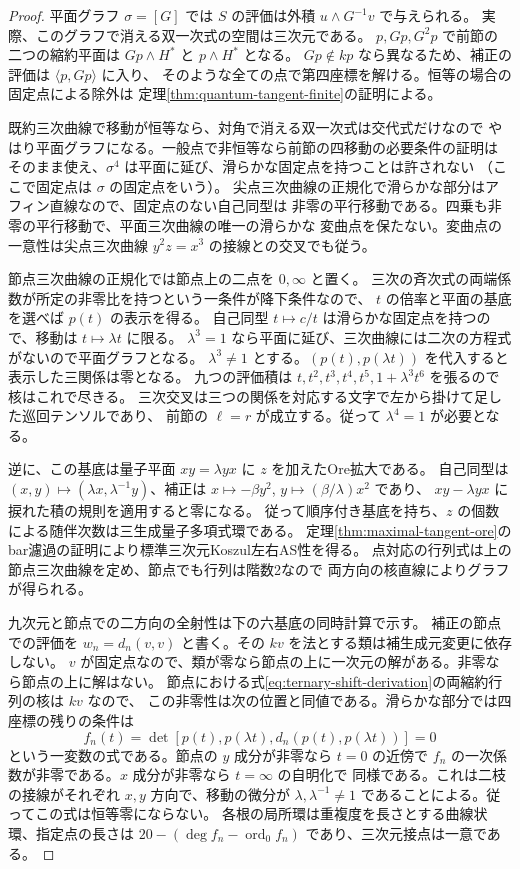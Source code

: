 \begin{proof}
平面グラフ $\sigma=[G]$ では $S$ の評価は外積 $u\wedge G^{-1}v$ で与えられる。
実際、このグラフで消える双一次式の空間は三次元である。
$p,Gp,G^2p$ で前節の二つの縮約平面は
$Gp\wedge H^*$ と $p\wedge H^*$ となる。
$Gp\not\in kp$ なら異なるため、補正の評価は $\langle p,Gp\rangle$ に入り、
そのような全ての点で第四座標を解ける。恒等の場合の固定点による除外は
定理\ref{thm:quantum-tangent-finite}の証明による。

既約三次曲線で移動が恒等なら、対角で消える双一次式は交代式だけなので
やはり平面グラフになる。一般点で非恒等なら前節の四移動の必要条件の証明は
そのまま使え、$\sigma^4$ は平面に延び、滑らかな固定点を持つことは許されない
（ここで固定点は $\sigma$ の固定点をいう）。
尖点三次曲線の正規化で滑らかな部分はアフィン直線なので、固定点のない自己同型は
非零の平行移動である。四乗も非零の平行移動で、平面三次曲線の唯一の滑らかな
変曲点を保たない。変曲点の一意性は尖点三次曲線 $y^2z=x^3$ の接線との交叉でも従う。

節点三次曲線の正規化では節点上の二点を $0,\infty$ と置く。
三次の斉次式の両端係数が所定の非零比を持つという一条件が降下条件なので、
$t$ の倍率と平面の基底を選べば $p(t)$ の表示を得る。
自己同型 $t\mapsto c/t$ は滑らかな固定点を持つので、移動は $t\mapsto\lambda t$ に限る。
$\lambda^3=1$ なら平面に延び、三次曲線には二次の方程式がないので平面グラフとなる。
$\lambda^3\ne1$ とする。$(p(t),p(\lambda t))$ を代入すると表示した三関係は零となる。
九つの評価積は $t,t^2,t^3,t^4,t^5,1+\lambda^3t^6$ を張るので核はこれで尽きる。
三次交叉は三つの関係を対応する文字で左から掛けて足した巡回テンソルであり、
前節の $\ell=r$ が成立する。従って $\lambda^4=1$ が必要となる。

逆に、この基底は量子平面 $xy=\lambda yx$ に $z$ を加えたOre拡大である。
自己同型は $(x,y)\mapsto(\lambda x,\lambda^{-1}y)$、補正は
$x\mapsto-\beta y^2$, $y\mapsto(\beta/\lambda)x^2$ であり、
$xy-\lambda yx$ に捩れた積の規則を適用すると零になる。
従って順序付き基底を持ち、$z$ の個数による随伴次数は三生成量子多項式環である。
定理\ref{thm:maximal-tangent-ore}のbar濾過の証明により標準三次元Koszul左右AS性を得る。
点対応の行列式は上の節点三次曲線を定め、節点でも行列は階数2なので
両方向の核直線によりグラフが得られる。

九次元と節点での二方向の全射性は下の六基底の同時計算で示す。
補正の節点での評価を $w_n=d_n(v,v)$ と書く。その $kv$ を法とする類は補生成元変更に依存しない。
$v$ が固定点なので、類が零なら節点の上に一次元の解がある。非零なら節点の上に解はない。
節点における式\eqref{eq:ternary-shift-derivation}の両縮約行列の核は $kv$ なので、
この非零性は次の位置と同値である。滑らかな部分では四座標の残りの条件は
\[
                 f_n(t)=\det[p(t),p(\lambda t),d_n(p(t),p(\lambda t))]=0
\]
という一変数の式である。節点の $y$ 成分が非零なら $t=0$ の近傍で
$f_n$ の一次係数が非零である。$x$ 成分が非零なら $t=\infty$ の自明化で
同様である。これは二枝の接線がそれぞれ $x,y$ 方向で、移動の微分が
$\lambda,\lambda^{-1}\ne1$ であることによる。従ってこの式は恒等零にならない。
各根の局所環は重複度を長さとする曲線状環、指定点の長さは
$20-(\deg f_n-\operatorname{ord}_0 f_n)$ であり、三次元接点は一意である。


\end{proof}
